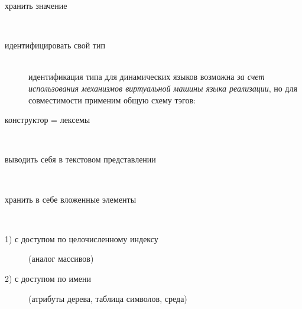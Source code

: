 \secdown


\begin{description}

\item[хранить значение]\ \\
\noindent{}

\item[идентифицировать свой тип]\ \\
идентификация типа для динамических языков возможна \emph{за счет использования
механизмов виртуальной машины языка реализации}, но для совместимости применим
общую схему тэгов:
\noindent{}

\item[конструктор = лексемы]\ \\
\noindent{}

\item[выводить себя в текстовом представлении]\ \\
\noindent{}

\item[хранить в себе вложенные элементы]\ \\
\noindent{}

\item[1) с доступом по целочисленному индексу] (аналог массивов)\ \\
\noindent{}
\noindent{}

\item[2) с доступом по имени] (атрибуты дерева, таблица символов, среда)\ \\
\noindent{}
\noindent{}
\noindent{}

\end{description}

\secup